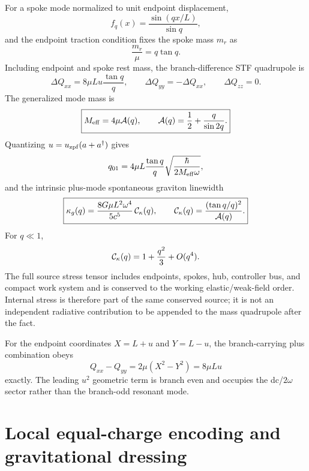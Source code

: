 For a spoke mode normalized to unit endpoint displacement,
\begin{equation}
f_q(x)=\frac{\sin(qx/L)}{\sin q},
\end{equation}
and the endpoint traction condition fixes the spoke mass $m_r$ as
\begin{equation}
\boxed{\frac{m_r}{\mu}=q\tan q.}
\label{eq:mrmu}
\end{equation}
Including endpoint and spoke rest mass, the branch-difference STF quadrupole is
\begin{equation}
\boxed{
\Delta Q_{xx}=8\mu Lu\frac{\tan q}{q},
\qquad
\Delta Q_{yy}=-\Delta Q_{xx},
\qquad
\Delta Q_{zz}=0.}
\label{eq:DeltaQ}
\end{equation}
The generalized mode mass is
\begin{equation}
\boxed{
M_{\rm eff}=4\mu \mathcal A(q),
\qquad
\mathcal A(q)=\frac12+\frac{q}{\sin2q}.}
\label{eq:Meff}
\end{equation}
Quantizing $u=u_{\rm zpf}(a+a^\dagger)$ gives
\begin{equation}
q_{01}=4\mu L\frac{\tan q}{q}
\sqrt{\frac{\hbar}{2M_{\rm eff}\omega}},
\end{equation}
and the intrinsic plus-mode spontaneous graviton linewidth
\begin{equation}
\boxed{
\kappa_g(q)=
\frac{8G\mu L^2\omega^4}{5c^5}\,
\mathcal C_\kappa(q),
\qquad
\mathcal C_\kappa(q)=\frac{(\tan q/q)^2}{\mathcal A(q)}.}
\label{eq:kappag}
\end{equation}
For $q\ll1$,
\begin{equation}
\mathcal C_\kappa(q)=1+\frac{q^2}{3}+O(q^4).
\end{equation}
The full source stress tensor includes endpoints, spokes, hub, controller bus, and compact work system and is conserved to the working elastic/weak-field order. Internal stress is therefore part of the same conserved source; it is not an independent radiative contribution to be appended to the mass quadrupole after the fact.

For the endpoint coordinates $X=L+u$ and $Y=L-u$, the branch-carrying plus combination obeys
\begin{equation}
Q_{xx}-Q_{yy}=2\mu(X^2-Y^2)=8\mu Lu
\end{equation}
exactly. The leading $u^2$ geometric term is branch even and occupies the dc/$2\omega$ sector rather than the branch-odd resonant mode.

\section{Local equal-charge encoding and gravitational dressing}
\label{sec:encoding}

